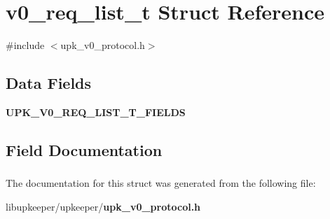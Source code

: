 \section{v0\_\-req\_\-list\_\-t Struct Reference}
\label{structv0__req__list__t}


{\ttfamily \#include $<$upk\_\-v0\_\-protocol.h$>$}

\subsection*{Data Fields}
\begin{DoxyCompactItemize}
\item 
{\bf UPK\_\-V0\_\-REQ\_\-LIST\_\-T\_\-FIELDS}
\end{DoxyCompactItemize}


\subsection{Field Documentation}
\subsubsection[{UPK\_\-V0\_\-REQ\_\-LIST\_\-T\_\-FIELDS}]{}\label{structv0__req__list__t_acf3eb49327b96aa57bc218564cf5ebd0}


The documentation for this struct was generated from the following file:\begin{DoxyCompactItemize}
\item 
libupkeeper/upkeeper/{\bf upk\_\-v0\_\-protocol.h}\end{DoxyCompactItemize}
